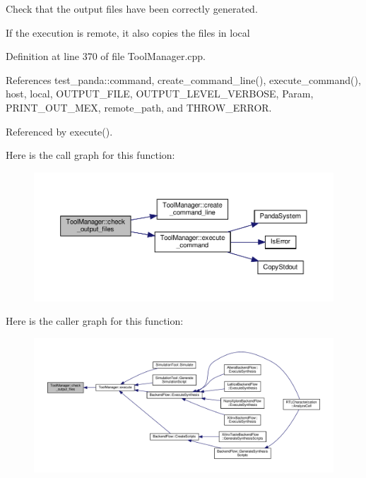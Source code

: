 Check that the output files have been correctly generated. 

If the execution is remote, it also copies the files in local 

Definition at line 370 of file Tool\+Manager.\+cpp.



References test\+\_\+panda\+::command, create\+\_\+command\+\_\+line(), execute\+\_\+command(), host, local, O\+U\+T\+P\+U\+T\+\_\+\+F\+I\+LE, O\+U\+T\+P\+U\+T\+\_\+\+L\+E\+V\+E\+L\+\_\+\+V\+E\+R\+B\+O\+SE, Param, P\+R\+I\+N\+T\+\_\+\+O\+U\+T\+\_\+\+M\+EX, remote\+\_\+path, and T\+H\+R\+O\+W\+\_\+\+E\+R\+R\+OR.



Referenced by execute().

Here is the call graph for this function\+:
\nopagebreak
\begin{figure}[H]
\begin{center}
\leavevmode
\includegraphics[width=350pt]{dc/dc5/classToolManager_ae3000ed97885017b442bc46241053510_cgraph}
\end{center}
\end{figure}
Here is the caller graph for this function\+:
\nopagebreak
\begin{figure}[H]
\begin{center}
\leavevmode
\includegraphics[width=350pt]{dc/dc5/classToolManager_ae3000ed97885017b442bc46241053510_icgraph}
\end{center}
\end{figure}
\mbox{\label{classToolManager_abc49a9ba19dbcea87407517f7f746d1d}} 
